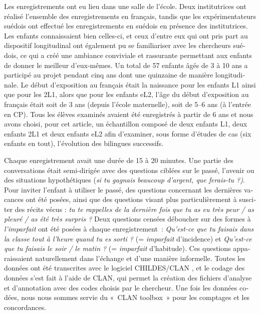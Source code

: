 \documentclass[french, output=paper]{langscibook}
\begin{document}
\begin{otherlanguage}{french}
Les enregistrements ont eu lieu dans une salle de l’école. Deux institutrices ont réalisé l’ensemble des enregistrements en français, tandis que les expérimentateurs suédois ont effectué les enregistrements en suédois en présence des institutrices. Les enfants connaissaient bien celles-ci, et ceux d’entre eux qui ont pris part au dispositif longitudinal ont également pu se familiariser avec les chercheurs suédois, ce qui a créé une ambiance conviviale et rassurante permettant aux enfants de donner le meilleur d’eux-mêmes. Un total de 57 enfants âgés de 3 à 10 ans a participé au projet pendant cinq ans dont une quinzaine de manière longitudinale. Le début d’exposition au français était la naissance pour les enfants L1 ainsi que pour les 2L1, alors que pour les enfants eL2, l’âge du début d’exposition au français était soit de 3 ans (depuis l’école maternelle), soit de 5--6 ans (à l’entrée en CP). Tous les élèves examinés avaient été enregistrés à partir de 6 ans et nous avons choisi, pour cet article, un échantillon composé de deux enfants L1, deux enfants 2L1 et deux enfants eL2 afin d’examiner, sous forme d’études de cas (six enfants en tout), l’évolution des bilingues successifs. 



Chaque enregistrement avait une durée de 15 à 20 minutes. Une partie des conversations était semi-dirigée avec des questions ciblées sur le passé, l’avenir ou des situations hypothétiques (\textit{si tu gagnais beaucoup d’argent, que ferais-tu ?)}. Pour inviter l’enfant à utiliser le passé, des questions concernant les dernières vacances ont été posées, ainsi que des questions visant plus particulièrement à susciter des récits vécus : \textit{tu te rappelles de la dernière fois que tu as eu très peur / as pleuré / as été très surpris ?} Deux questions censées déboucher sur des formes à \textit{l’imparfait} ont été posées à chaque enregistrement\textit{~}: \textit{Qu’est-ce que tu faisais dans la classe tout à l’heure quand tu es sorti ?} (= \textit{imparfait} d’incidence) et \textit{Qu’est-ce que tu faisais le soir / le matin ?} (= \textit{imparfait} d’habitude). Ces questions apparaissaient naturellement dans l’échange et d’une manière informelle. Toutes les données ont été transcrites avec le logiciel CHILDES/CLAN \citep{MacWhinney2000}, et le codage des données s’est fait à l’aide de CLAN, qui permet la création des fichiers d’analyse et d’annotation avec des codes choisis par le chercheur. Une fois les données codées, nous nous sommes servie du «~CLAN toolbox~» pour les comptages et les concordances. 



\end{otherlanguage}
\end{document}
